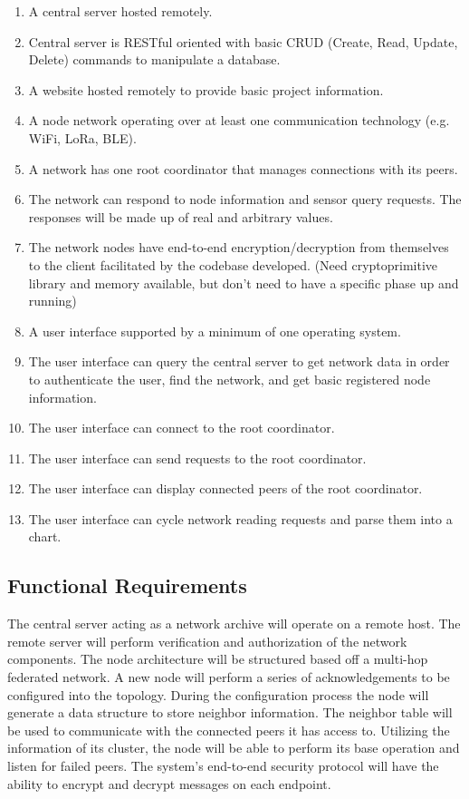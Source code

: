 \documentclass[tikz,a4paper,titlepage]{article}
\begin{document}
\begin{enumerate}
    \item A central server hosted remotely.
    \item Central server is RESTful oriented with basic CRUD (Create, Read, Update, Delete) commands to manipulate a database.
    \item A website hosted remotely to provide basic project information.
    \item A node network operating over at least one communication technology (e.g. WiFi, LoRa, BLE).
    \item A network has one root coordinator that manages connections with its peers.
    \item The network can respond to node information and sensor query requests. The responses will be made up of real and arbitrary values. 
    \item The network nodes have end-to-end encryption/decryption from themselves to the client facilitated by the codebase developed. (Need cryptoprimitive library and memory available, but don't need to have a specific phase up and running)
    \item A user interface supported by a minimum of one operating system.
    \item The user interface can query the central server to get network data in order to authenticate the user, find the network, and get basic registered node information.
    \item The user interface can connect to the root coordinator.
    \item The user interface can send requests to the root coordinator. 
    \item The user interface can display connected peers of the root coordinator. 
    \item The user interface can cycle network reading requests and parse them into a chart.
\end{enumerate}

\subsection{Functional Requirements} %

The central server acting as a network archive will operate on a remote host. The remote server will perform verification and authorization of the network components. The node architecture will be structured based off a multi-hop federated network. A new node will perform a series of acknowledgements to be configured into the topology. During the configuration process the node will generate a data structure to store neighbor information. The neighbor table will be used to communicate with the connected peers it has access to. Utilizing the information of its cluster, the node will be able to perform its base operation and listen for failed peers. The system's end-to-end security protocol will have the ability to encrypt and decrypt messages on each endpoint. 
\end{document}
